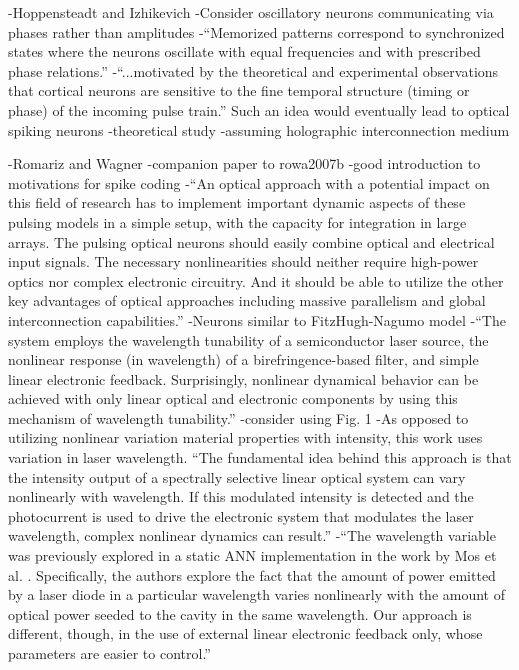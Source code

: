 \cite{hoiz2000}
-Hoppensteadt and Izhikevich
-Consider oscillatory neurons communicating via phases rather than amplitudes
-``Memorized patterns correspond to synchronized states where the neurons oscillate with equal frequencies and with prescribed phase relations.''
-``...motivated by the theoretical and experimental observations that cortical neurons are sensitive to the fine temporal structure (timing or phase) of the incoming pulse train.'' Such an idea would eventually lead to optical spiking neurons
-theoretical study
-assuming holographic interconnection medium


\cite{rowa2007a}
-Romariz and Wagner
-companion paper to rowa2007b
-good introduction to motivations for spike coding
-``An optical approach with a potential impact on this field of research has to implement important dynamic aspects of these pulsing models in a simple setup, with the capacity for integration in large arrays. The pulsing optical neurons should easily combine optical and electrical input signals. The necessary nonlinearities should neither require high-power optics nor complex electronic circuitry. And it should be able to utilize the other key advantages of optical approaches including massive parallelism and global interconnection capabilities.''
-Neurons similar to FitzHugh-Nagumo model
-``The system employs the wavelength tunability of a semiconductor laser source, the nonlinear response (in wavelength) of a birefringence-based filter, and simple linear electronic feedback. Surprisingly, nonlinear dynamical behavior can be achieved with only linear optical and electronic components by using this mechanism of wavelength tunability.''
-consider using Fig. 1
-As opposed to utilizing nonlinear variation material properties with intensity, this work uses variation in laser wavelength. ``The fundamental idea behind this approach is that the intensity output of a spectrally selective linear optical system can vary nonlinearly with wavelength. If this modulated intensity is detected and the photocurrent is used to drive the electronic system that modulates the laser wavelength, complex nonlinear dynamics can result.''
-``The wavelength variable was previously explored in a static ANN implementation in the work by Mos et al. \cite{moju2000}. Specifically, the authors explore the fact that the amount of power emitted by a laser diode in a particular wavelength varies nonlinearly with the amount of optical power seeded to the cavity in the same wavelength. Our approach is different, though, in the use of external linear electronic feedback only, whose parameters are easier to control.''
